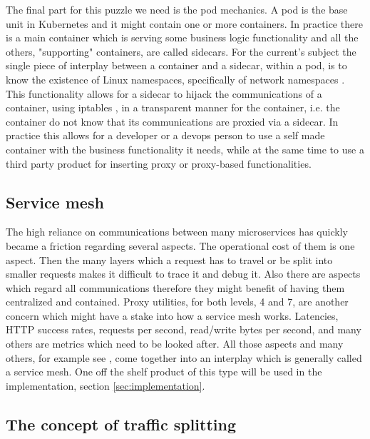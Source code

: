 \documentclass[conference]{IEEEtran}
\begin{document}
    The final part for this puzzle we need is the pod mechanics. A pod is the base unit in Kubernetes and it might contain one or more containers. In practice there is a main container which is serving some business logic functionality and all the others, "supporting" containers, are called sidecars. For the current's subject the single piece of interplay between a container and a sidecar, within a pod, is to know the existence of Linux namespaces, specifically of network namespaces \cite{b12}. This functionality allows for a sidecar to hijack the communications of a container, using iptables \cite{b13}, in a transparent manner for the container, i.e. the container do not know that its communications are proxied via a sidecar. In practice this allows for a developer or a devops person to use a self made container with the business functionality it needs, while at the same time to use a third party product for inserting proxy or proxy-based functionalities.

\subsection{Service mesh}

    The high reliance on communications between many microservices has quickly became a friction regarding several aspects. The operational cost of them is one aspect. Then the many layers which a request has to travel or be split into smaller requests makes it difficult to trace it and debug it. Also there are aspects which regard all communications therefore they might benefit of having them centralized and contained. Proxy utilities, for both levels, 4 and 7, are another concern which might have a stake into how a service mesh works. Latencies, HTTP success rates, requests per second, read/write bytes per second, and many others are metrics which need to be looked after. All those aspects and many others, for example see \cite{b15}, come together into an interplay which is generally called a service mesh. One off the shelf product of this type will be used in the implementation, section \ref{sec:implementation}.

\subsection{The concept of traffic splitting}
\end{document}
